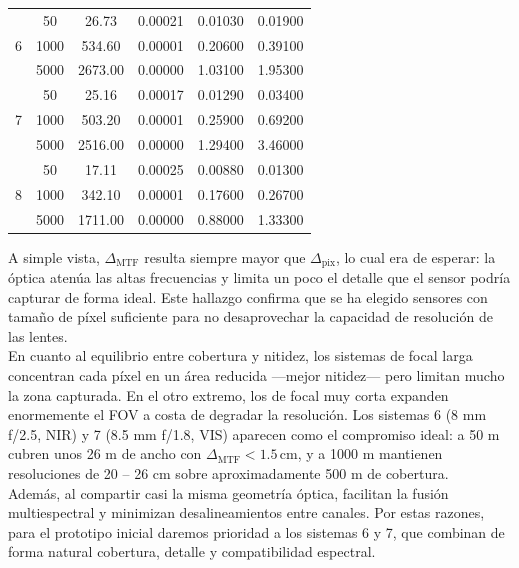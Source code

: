 \begin{table}[h]
\begin{tabular}{|c|c|c|c|c|c|}
        \multirow{3}{*}{6}
         & 50   & 26.73  & 0.00021   & 0.01030  & 0.01900   \\ 
         & 1000 & 534.60 & 0.00001   & 0.20600  & 0.39100   \\ 
         & 5000 & 2673.00& 0.00000   & 1.03100  & 1.95300   \\ 
        \hline
        
        \multirow{3}{*}{7}
         & 50   & 25.16  & 0.00017   & 0.01290  & 0.03400   \\ 
         & 1000 & 503.20 & 0.00001   & 0.25900  & 0.69200   \\ 
         & 5000 & 2516.00& 0.00000   & 1.29400  & 3.46000   \\ 
        \hline
        
        \multirow{3}{*}{8}
         & 50   & 17.11  & 0.00025   & 0.00880  & 0.01300   \\ 
         & 1000 & 342.10 & 0.00001   & 0.17600  & 0.26700   \\ 
         & 5000 & 1711.00& 0.00000   & 0.88000  & 1.33300   \\ 
        \hline
    \end{tabular}
\end{table}




\noindent A simple vista, \(\Delta_{\mathrm{MTF}}\) resulta siempre mayor que \(\Delta_{\mathrm{pix}}\), lo cual era de esperar: la óptica atenúa las altas frecuencias y limita un poco el detalle que el sensor podría capturar de forma ideal. Este hallazgo confirma que se ha elegido sensores con tamaño de píxel suficiente para no desaprovechar la capacidad de resolución de las lentes.\\

\noindent En cuanto al equilibrio entre cobertura y nitidez, los sistemas de focal larga concentran cada píxel en un área reducida —mejor nitidez— pero limitan mucho la zona capturada. En el otro extremo, los de focal muy corta expanden enormemente el FOV a costa de degradar la resolución. Los sistemas 6 (8 mm f/2.5, NIR) y 7 (8.5 mm f/1.8, VIS) aparecen como el compromiso ideal: a 50 m cubren unos 26 m de ancho con \(\Delta_{\mathrm{MTF}}<1.5\)\,cm, y a 1000 m mantienen resoluciones de 20 – 26 cm sobre aproximadamente 500 m de cobertura.\\

\noindent Además, al compartir casi la misma geometría óptica, facilitan la fusión multiespectral y minimizan desalineamientos entre canales. Por estas razones, para el prototipo inicial daremos prioridad a los sistemas 6 y 7, que combinan de forma natural cobertura, detalle y compatibilidad espectral.\\


